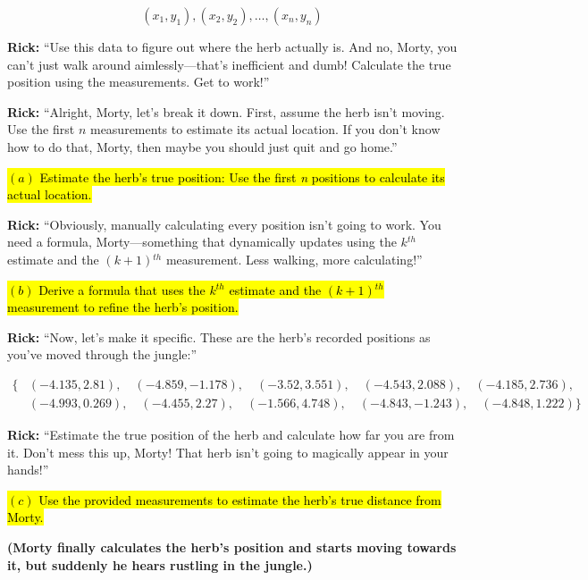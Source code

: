 \documentclass[a4paper, 12pt]{exam}
\begin{document}
\[
(x_1, y_1), (x_2, y_2), \dots, (x_n, y_n)
\]

\noindent \textbf{Rick:} “Use this data to figure out where the herb actually is. And no, Morty, you can’t just walk around aimlessly—that’s inefficient and dumb! Calculate the true position using the measurements. Get to work!”

\bigskip

\noindent \textbf{Rick:} “Alright, Morty, let’s break it down. First, assume the herb isn’t moving. Use the first \(n\) measurements to estimate its actual location. If you don’t know how to do that, Morty, then maybe you should just quit and go home.”

\bigskip
\hl{$(a)$ Estimate the herb's true position: Use the first \textit{n} positions to calculate its actual location.}
\bigskip

\noindent \textbf{Rick:} “Obviously, manually calculating every position isn’t going to work. You need a formula, Morty—something that dynamically updates using the \(k\)$^{th}$ estimate and the \((k+1)\)$^{th}$ measurement. Less walking, more calculating!”

\bigskip
\hl{$(b)$ Derive a formula that uses the $k$$^{th}$ estimate and the $(k+1)$$^{th}$ measurement to refine the herb's position.}

\bigskip

\noindent \textbf{Rick:} “Now, let’s make it specific. These are the herb’s recorded positions as you’ve moved through the jungle:”

\[
\begin{aligned}
\{ 
&(-4.135, 2.81), \quad (-4.859, -1.178), \quad (-3.52, 3.551), \quad (-4.543, 2.088), \quad  (-4.185, 2.736), \\
&(-4.993, 0.269), \quad (-4.455, 2.27), \quad (-1.566, 4.748), \quad (-4.843, -1.243), \quad (-4.848, 1.222)
\}
\end{aligned}
\]

\noindent \textbf{Rick:} “Estimate the true position of the herb and calculate how far you are from it. Don’t mess this up, Morty! That herb isn’t going to magically appear in your hands!”

\bigskip

\hl{$(c)$ Use the provided measurements to estimate the herb's true distance from Morty.}
\bigskip

\noindent \textbf{(Morty finally calculates the herb’s position and starts moving towards it, but suddenly he hears rustling in the jungle.)}
\end{document}
